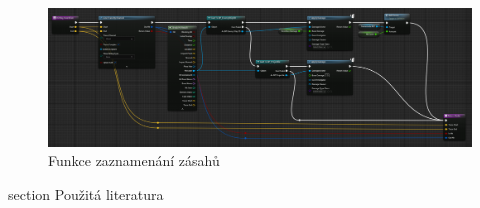 \documentclass[12pt,a4paper,hidelinks]{article}
\begin{document}
\begin{landscape}
\begin{figure}[h!]
\centering
\includegraphics[width=1.0\linewidth]{images/hitreg.png}
\caption{Funkce zaznamenání zásahů}
\label{burst}
\end{figure}
\clearpage
\end{landscape}


\printbibliography
{} {section} {Použitá literatura}
\end{document}
